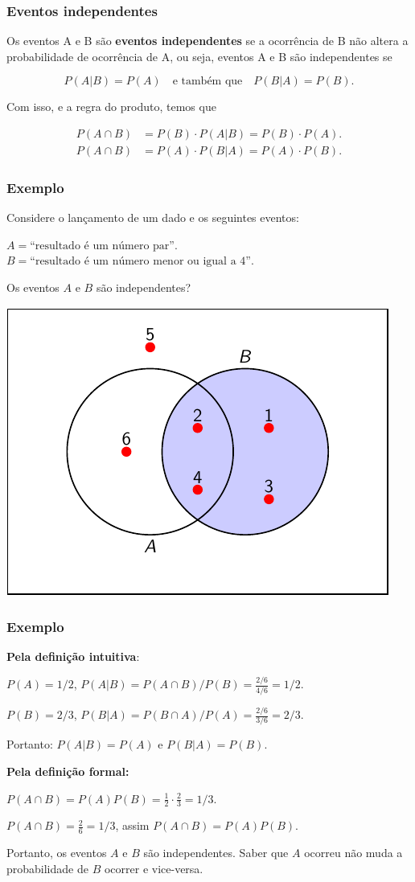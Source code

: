 \documentclass[11pt]{beamer}
\begin{document}
\begin{frame}
\frametitle{Eventos independentes}

Os eventos A e B são \textbf{eventos independentes} se a ocorrência de B
não altera a probabilidade de ocorrência de A, ou seja, eventos A e B
são independentes se

\[
P(A|B) = P(A) \quad \text{e também que} \quad P(B|A) = P(B).
\]

Com isso, e a regra do produto, temos que

\begin{align*}
P(A \cap B) &= P(B) \cdot P(A|B) = P(B) \cdot P(A). \\
P(A \cap B) &= P(A) \cdot P(B|A) = P(A) \cdot P(B).
\end{align*}
\end{frame}

\begin{frame}
\frametitle{Exemplo}

Considere o lançamento de um dado e os seguintes eventos:

\(A = \text{``resultado é um número par''}\).
\(B = \text{``resultado é um número menor ou igual a 4''}\).

Os eventos \(A\) e \(B\) são independentes?


\begin{center}\includegraphics[width=0.4\linewidth]{figs/independencia-crop} \end{center}
\end{frame}

\begin{frame}
\frametitle{Exemplo}

\textbf{Pela definição intuitiva}:

\(P(A) = 1/2\),
\quad \(P(A|B) = P(A\cap B)/P(B) = \frac{2/6}{4/6} = 1/2\).

\(P(B) = 2/3\),
\quad \(P(B|A) = P(B\cap A)/P(A) = \frac{2/6}{3/6} = 2/3\).

Portanto: \(P(A|B) = P(A)\) e \(P(B|A) = P(B)\).

\textbf{Pela definição formal:}

\(P(A \cap B) = P(A)P(B) = \frac{1}{2} \cdot \frac{2}{3} = 1/3.\)

\(P(A \cap B) = \frac{2}{6} = 1/3\), assim \(P(A \cap B) = P(A)P(B).\)

Portanto, os eventos \(A\) e \(B\) são independentes. Saber que \(A\)
ocorreu não muda a probabilidade de \(B\) ocorrer e vice-versa.
\end{frame}
\end{document}
